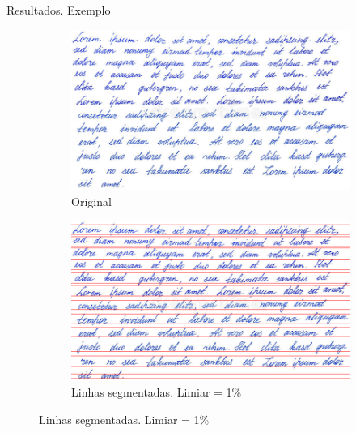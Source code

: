 \documentclass{beamer}
\begin{document}
\begin{frame}[allowframebreaks]{Resultados. Exemplo}
\framebreak

\begin{figure}
    \centering
    \begin{subfigure}[]{0.49\textwidth}
        \centering
        \includegraphics[width=\textwidth]{images/handwrite.png}
        \caption{Original}
    \end{subfigure}
    \begin{subfigure}[]{0.49\textwidth}
        \centering
        \includegraphics[width=\textwidth]{images/handwrite_lines_01.png}
        \caption{Linhas segmentadas. Limiar = 1\%}
    \end{subfigure}
\end{figure}

\framebreak


\end{frame}
\end{document}
